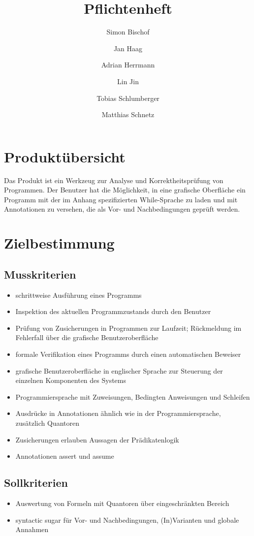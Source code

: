 \documentclass[a4paper,10pt]{article}
\title{Pflichtenheft}
\author{Simon Bischof \and Jan Haag \and Adrian Herrmann \and Lin Jin \and Tobias Schlumberger \and Matthias Schnetz}
\begin{document}
\maketitle
\newpage
\tableofcontents
\newpage

\section{Produktübersicht}

Das Produkt ist ein Werkzeug zur Analyse und Korrektheitsprüfung von Programmen. Der Benutzer hat die Möglichkeit, in eine grafische Oberfläche ein Programm mit der im Anhang spezifizierten While-Sprache zu laden und mit Annotationen zu versehen, die als Vor- und Nachbedingungen geprüft werden.

\section{Zielbestimmung}

\subsection{Musskriterien}
\begin{itemize}
  \item schrittweise Ausführung eines Programms
  \item Inspektion des aktuellen Programmzustands durch den Benutzer
  \item Prüfung von Zusicherungen in Programmen zur Laufzeit; Rückmeldung im  Fehlerfall über die grafische Benutzeroberfläche
  \item formale Verifikation eines Programms durch einen automatischen Beweiser
  \item grafische Benutzeroberfläche in englischer Sprache zur Steuerung der einzelnen Komponenten des Systems
  \item Programmiersprache mit Zuweisungen, Bedingten Anweisungen und Schleifen
  \item Ausdrücke in Annotationen ähnlich wie in der Programmiersprache, zusätzlich Quantoren
  \item Zusicherungen erlauben Aussagen der Prädikatenlogik
  \item Annotationen assert und assume
\end{itemize}

\subsection{Sollkriterien}
\begin{itemize}
  \item Auswertung von Formeln mit Quantoren über eingeschränkten Bereich
  \item syntactic sugar für Vor- und Nachbedingungen, (In)Varianten und globale Annahmen
\end{itemize}
\end{document}

